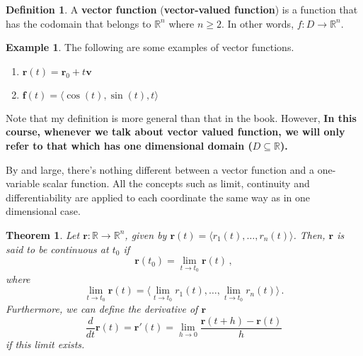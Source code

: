 \documentclass[
]{article}
\newtheorem{theorem}{Theorem}[section]
\theoremstyle{definition}
\newtheorem{definition}{Definition}[section]
\theoremstyle{definition}
\newtheorem{example}{Example}[section]
\theoremstyle{definition}
\theoremstyle{definition}
\theoremstyle{remark}
\begin{document}
\begin{definition}
A \textbf{vector function} (\textbf{vector-valued function}) is a function that has the codomain that belongs to \(\mathbb{R}^n\) where \(n\geq 2\). In other words, \(f: D \to \mathbb{R}^n\).
\end{definition}

\begin{example}

The following are some examples of vector functions.

\begin{enumerate}
\def\labelenumi{\arabic{enumi}.}
\item
  \(\mathbf{r}(t) = \mathbf{r}_0 + t\mathbf{v}\)
\item
  \(\mathbf{f}(t) = \langle \cos(t),\sin(t), t \rangle\)
\end{enumerate}

\end{example}

Note that my definition is more general than that in the book.
However,
\textbf{In this course, whenever we talk about vector valued function, we will only refer to
that which has one dimensional domain (\(D \subseteq \mathbb{R}\)).}

By and large, there's nothing different between a vector function and
a one-variable scalar function.
All the concepts such as limit, continuity and differentiability are applied
to each coordinate the same way as in one dimensional case.

\begin{theorem}
Let \(\mathbf{r}: \mathbb{R}\to \mathbb{R}^n\), given by \(\mathbf{r}(t) = \langle r_1(t), \dots , r_n(t) \rangle\).
Then, \(\mathbf{r}\) is said to be continuous at \(t_0\) if
\begin{equation*}
    \mathbf{r}(t_0) = \lim_{t\to t_0} \mathbf{r}(t) \,,
\end{equation*}
where
\begin{equation*}
    \lim_{t\to t_0} \mathbf{r}(t) = \langle \lim_{t\to t_0}r_1(t) , \dots , \lim_{t\to t_0} r_n(t) \rangle \,. 
\end{equation*}
Furthermore, we can define the derivative of \(\mathbf{r}\)
\begin{equation*}
    \frac{d}{dt} \mathbf{r}(t) = \mathbf{r}'(t) = \lim_{h\to 0} \frac{\mathbf{r}(t+h) - \mathbf{r}(t)}{h} 
\end{equation*}
if this limit exists.
\end{theorem}
\end{document}
